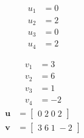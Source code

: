 \[\begin{aligned}
u_{1} &= 0 \\
u_{2} &= 2 \\
u_{3} &= 0 \\
u_{4} &= 2 
\end{aligned}\]

\[\begin{aligned}
v_{1} &= 3 \\
v_{2} &= 6 \\
v_{3} &= 1 \\
v_{4} &= -2 
\end{aligned}\]
\[\begin{aligned}
\mathbf{u} &= \begin{bmatrix}0\;2\;0\;2\end{bmatrix} \\
\mathbf{v} &= \begin{bmatrix}3\;6\;1\;-2\end{bmatrix}
\end{aligned}\]

